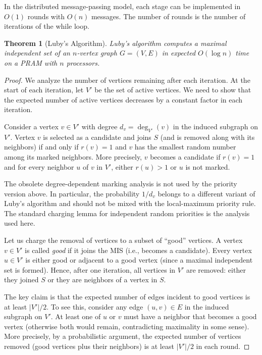 \documentclass[twoside,12pt]{book}
\theoremstyle{plain}
\newtheorem{theorem}{Theorem}[chapter]
\theoremstyle{definition}
\theoremstyle{remark}
\begin{document}
In the distributed message-passing model, each stage can be implemented in $O(1)$ rounds with $O(n)$ messages. The number of rounds is the number of iterations of the while loop.

\begin{theorem}[Luby's Algorithm]
\label{thm:luby}
Luby's algorithm computes a maximal independent set of an $n$-vertex graph $G = (V, E)$ in expected $O(\log n)$ time on a PRAM with $n$ processors.
\end{theorem}

\begin{proof}
We analyze the number of vertices remaining after each iteration. At the start of each iteration, let $V'$ be the set of active vertices. We need to show that the expected number of active vertices decreases by a constant factor in each iteration.

Consider a vertex $v \in V'$ with degree $d_v = \deg_{V'}(v)$ in the induced subgraph on $V'$. Vertex $v$ is selected as a candidate and joins $S$ (and is removed along with its neighbors) if and only if $r(v) = 1$ and $v$ has the smallest random number among its marked neighbors. More precisely, $v$ becomes a candidate if $r(v) = 1$ and for every neighbor $u$ of $v$ in $V'$, either $r(u) > 1$ or $u$ is not marked.

The obsolete degree-dependent marking analysis is not used by the priority
version above. In particular, the probability $1/d_v$ belongs to a different
variant of Luby's algorithm and should not be mixed with the local-maximum
priority rule. The standard charging lemma for independent random priorities
is the analysis used here.

Let us charge the removal of vertices to a subset of ``good'' vertices. A vertex $v \in V'$ is called \emph{good} if it joins the MIS (i.e., becomes a candidate). Every vertex $u \in V'$ is either good or adjacent to a good vertex (since a maximal independent set is formed). Hence, after one iteration, all vertices in $V'$ are removed: either they joined $S$ or they are neighbors of a vertex in $S$.

The key claim is that the expected number of edges incident to good vertices is at least $|V'|/2$. To see this, consider any edge $(u, v) \in E$ in the induced subgraph on $V'$. At least one of $u$ or $v$ must have a neighbor that becomes a good vertex (otherwise both would remain, contradicting maximality in some sense). More precisely, by a probabilistic argument, the expected number of vertices removed (good vertices plus their neighbors) is at least $|V'|/2$ in each round.


\end{proof}
\end{document}
